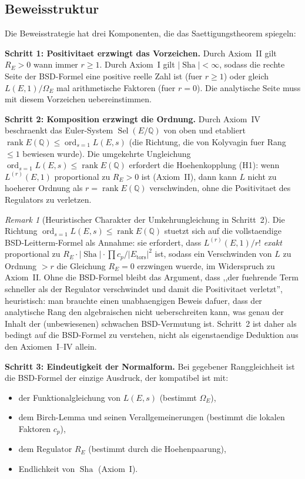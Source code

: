 \documentclass[aps,prd,twocolumn,superscriptaddress,nofootinbib]{revtex4-2}
\theoremstyle{definition}
\theoremstyle{remark}
\newtheorem{remark}[theorem]{Remark}
\DeclareMathOperator{\ord}{ord}
\DeclareMathOperator{\rank}{rank}
\DeclareMathOperator{\Sel}{Sel}
\DeclareMathOperator{\Sha}{Sha}
\begin{document}
\subsection{Beweisstruktur}

Die Beweisstrategie hat drei Komponenten, die das Saettigungstheorem spiegeln:

\textbf{Schritt 1: Positivitaet erzwingt das Vorzeichen.} Durch Axiom~II gilt $R_E > 0$ wann immer $r \geq 1$. Durch Axiom~I gilt $|\Sha| < \infty$, sodass die rechte Seite der BSD-Formel eine positive reelle Zahl ist (fuer $r \geq 1$) oder gleich $L(E,1)/\Omega_E$ mal arithmetische Faktoren (fuer $r = 0$). Die analytische Seite muss mit diesem Vorzeichen uebereinstimmen.

\textbf{Schritt 2: Komposition erzwingt die Ordnung.} Durch Axiom~IV beschraenkt das Euler-System $\Sel(E/\mathbb{Q})$ von oben und etabliert $\rank E(\mathbb{Q}) \leq \ord_{s=1} L(E,s)$ (die Richtung, die von Kolyvagin fuer Rang $\leq 1$ bewiesen wurde). Die umgekehrte Ungleichung $\ord_{s=1} L(E,s) \leq \rank E(\mathbb{Q})$ erfordert die Hoehenkopplung (H1): wenn $L^{(r)}(E,1)$ proportional zu $R_E > 0$ ist (Axiom~II), dann kann $L$ nicht zu hoeherer Ordnung als $r = \rank E(\mathbb{Q})$ verschwinden, ohne die Positivitaet des Regulators zu verletzen.

\begin{remark}[Heuristischer Charakter der Umkehrungleichung in Schritt~2]
Die Richtung $\ord_{s=1} L(E,s) \leq \rank E(\mathbb{Q})$ stuetzt sich auf die vollstaendige BSD-Leitterm-Formel als Annahme: sie erfordert, dass $L^{(r)}(E,1)/r!$ \textit{exakt} proportional zu $R_E \cdot |\Sha| \cdot \prod c_p / |E_{\mathrm{tors}}|^2$ ist, sodass ein Verschwinden von $L$ zu Ordnung $> r$ die Gleichung $R_E = 0$ erzwingen wuerde, im Widerspruch zu Axiom~II. Ohne die BSD-Formel bleibt das Argument, dass ,,der fuehrende Term schneller als der Regulator verschwindet und damit die Positivitaet verletzt'', heuristisch: man brauchte einen unabhaengigen Beweis dafuer, dass der analytische Rang den algebraischen nicht ueberschreiten kann, was genau der Inhalt der (unbewiesenen) schwachen BSD-Vermutung ist. Schritt~2 ist daher als bedingt auf die BSD-Formel zu verstehen, nicht als eigenstaendige Deduktion aus den Axiomen~I--IV allein.
\end{remark}

\textbf{Schritt 3: Eindeutigkeit der Normalform.} Bei gegebener Ranggleichheit ist die BSD-Formel der einzige Ausdruck, der kompatibel ist mit:
\begin{itemize}
\item der Funktionalgleichung von $L(E,s)$ (bestimmt $\Omega_E$),
\item dem Birch-Lemma und seinen Verallgemeinerungen (bestimmt die lokalen Faktoren $c_p$),
\item dem Regulator $R_E$ (bestimmt durch die Hoehenpaarung),
\item Endlichkeit von $\Sha$ (Axiom~I).
\end{itemize}
\end{document}
